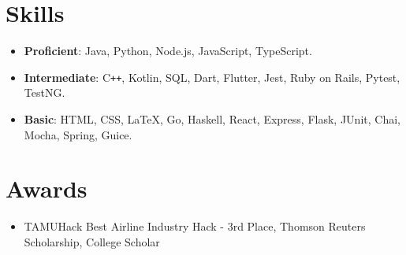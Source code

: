 \documentclass[letterpaper,11pt]{article}
\newcommand{\resumeItem}[1]{
  \item\small{
    #1 \vspace{-2pt}
  }
}
\newcommand{\resumeSubItem}[1]{\resumeItem{#1}\vspace{-4pt}}
\newcommand{\resumeSubHeadingListStart}{\begin{itemize}[leftmargin=*]}
\newcommand{\resumeSubHeadingListEnd}{\end{itemize}}
\begin{document}
\section{Skills}
  \resumeSubHeadingListStart
    \resumeSubItem
      {\textbf{Proficient}: Java, Python, Node.js, JavaScript, TypeScript.}
    \resumeSubItem
      {\textbf{Intermediate}: C\texttt{++}, Kotlin, SQL, Dart, Flutter, Jest, Ruby on Rails, Pytest, TestNG.}
    \resumeSubItem
      {\textbf{Basic}: HTML, CSS, \LaTeX, Go, Haskell, React, Express, Flask, JUnit, Chai, Mocha, Spring, Guice.}
  \resumeSubHeadingListEnd

\section{Awards}
  \resumeSubHeadingListStart
    \resumeSubItem
      {TAMUHack Best Airline Industry Hack - 3rd Place, Thomson Reuters Scholarship, College Scholar}
  \resumeSubHeadingListEnd

\end{document}
